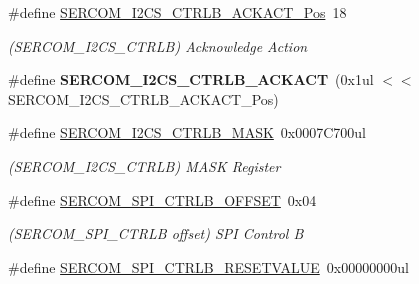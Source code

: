 \begin{DoxyCompactItemize}
\item 
\hypertarget{group___s_a_m_l21___s_e_r_c_o_m_ga9a5be18c7e0c42dc20a693178c2912e2}{}\#define \hyperlink{group___s_a_m_l21___s_e_r_c_o_m_ga9a5be18c7e0c42dc20a693178c2912e2}{S\+E\+R\+C\+O\+M\+\_\+\+I2\+C\+S\+\_\+\+C\+T\+R\+L\+B\+\_\+\+A\+C\+K\+A\+C\+T\+\_\+\+Pos}~18\label{group___s_a_m_l21___s_e_r_c_o_m_ga9a5be18c7e0c42dc20a693178c2912e2}

\begin{DoxyCompactList}\small\item\em (S\+E\+R\+C\+O\+M\+\_\+\+I2\+C\+S\+\_\+\+C\+T\+R\+L\+B) Acknowledge Action \end{DoxyCompactList}\item 
\hypertarget{group___s_a_m_l21___s_e_r_c_o_m_ga889f643cb96a7c2ce9eaa1fe3ac06a04}{}\#define {\bfseries S\+E\+R\+C\+O\+M\+\_\+\+I2\+C\+S\+\_\+\+C\+T\+R\+L\+B\+\_\+\+A\+C\+K\+A\+C\+T}~(0x1ul $<$$<$ S\+E\+R\+C\+O\+M\+\_\+\+I2\+C\+S\+\_\+\+C\+T\+R\+L\+B\+\_\+\+A\+C\+K\+A\+C\+T\+\_\+\+Pos)\label{group___s_a_m_l21___s_e_r_c_o_m_ga889f643cb96a7c2ce9eaa1fe3ac06a04}

\item 
\hypertarget{group___s_a_m_l21___s_e_r_c_o_m_ga0ea23da70bd50b06c4128f0c984cbf9f}{}\#define \hyperlink{group___s_a_m_l21___s_e_r_c_o_m_ga0ea23da70bd50b06c4128f0c984cbf9f}{S\+E\+R\+C\+O\+M\+\_\+\+I2\+C\+S\+\_\+\+C\+T\+R\+L\+B\+\_\+\+M\+A\+S\+K}~0x0007\+C700ul\label{group___s_a_m_l21___s_e_r_c_o_m_ga0ea23da70bd50b06c4128f0c984cbf9f}

\begin{DoxyCompactList}\small\item\em (S\+E\+R\+C\+O\+M\+\_\+\+I2\+C\+S\+\_\+\+C\+T\+R\+L\+B) M\+A\+S\+K Register \end{DoxyCompactList}\item 
\hypertarget{group___s_a_m_l21___s_e_r_c_o_m_ga793c49a07dc02c8237ab63e52fd0304c}{}\#define \hyperlink{group___s_a_m_l21___s_e_r_c_o_m_ga793c49a07dc02c8237ab63e52fd0304c}{S\+E\+R\+C\+O\+M\+\_\+\+S\+P\+I\+\_\+\+C\+T\+R\+L\+B\+\_\+\+O\+F\+F\+S\+E\+T}~0x04\label{group___s_a_m_l21___s_e_r_c_o_m_ga793c49a07dc02c8237ab63e52fd0304c}

\begin{DoxyCompactList}\small\item\em (S\+E\+R\+C\+O\+M\+\_\+\+S\+P\+I\+\_\+\+C\+T\+R\+L\+B offset) S\+P\+I Control B \end{DoxyCompactList}\item 
\hypertarget{group___s_a_m_l21___s_e_r_c_o_m_ga9a39beaf6f38afbcadd9478ef2ccad06}{}\#define \hyperlink{group___s_a_m_l21___s_e_r_c_o_m_ga9a39beaf6f38afbcadd9478ef2ccad06}{S\+E\+R\+C\+O\+M\+\_\+\+S\+P\+I\+\_\+\+C\+T\+R\+L\+B\+\_\+\+R\+E\+S\+E\+T\+V\+A\+L\+U\+E}~0x00000000ul\label{group___s_a_m_l21___s_e_r_c_o_m_ga9a39beaf6f38afbcadd9478ef2ccad06}


\end{DoxyCompactItemize}
